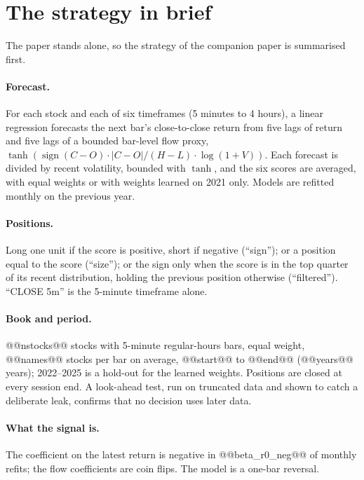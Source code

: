 \documentclass[11pt,a4paper]{article}
\begin{document}
\section{The strategy in brief}
\label{sec:strategy}

The paper stands alone, so the strategy of the companion paper is summarised first.


\paragraph{Forecast.} For each stock and each of six timeframes (5 minutes to 4 hours), a linear
regression forecasts the next bar's close-to-close return from five lags of return and five lags of a
bounded bar-level flow proxy, $\tanh(\operatorname{sign}(C-O)\cdot|C-O|/(H-L)\cdot\log(1+V))$. Each forecast
is divided by recent volatility, bounded with $\tanh$, and the six scores are averaged, with equal weights
or with weights learned on 2021 only. Models are refitted monthly on the previous year.

\paragraph{Positions.} Long one unit if the score is positive, short if negative (``sign''); or a position
equal to the score (``size''); or the sign only when the score is in the top quarter of its recent
distribution, holding the previous position otherwise (``filtered''). ``CLOSE 5m'' is the 5-minute
timeframe alone.

\paragraph{Book and period.} @@nstocks@@ stocks with 5-minute regular-hours bars, equal weight,
@@names@@ stocks per bar on average, @@start@@ to @@end@@ (@@years@@ years); 2022--2025 is a hold-out for
the learned weights. Positions are closed at every session end. A look-ahead test, run on truncated
data and shown to catch a deliberate leak, confirms that no decision uses later data.

\paragraph{What the signal is.} The coefficient on the latest return is negative in @@beta_r0_neg@@ of
monthly refits; the flow coefficients are coin flips. The model is a one-bar reversal.
\end{document}
